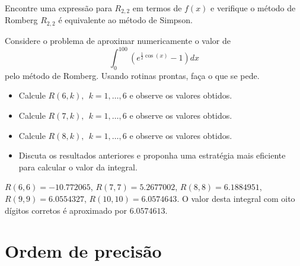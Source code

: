 \begin{Exercise}
Encontre uma expressão para $R_{2,2}$ em termos de $f(x)$ e verifique o método de Romberg $R_{2,2}$ é equivalente ao método de Simpson.
\end{Exercise}

\begin{Exercise}
Considere o problema de aproximar numericamente o valor de
$$\int_0^{100} \left(e^{\frac{1}{2}\cos(x)}-1\right)dx$$
pelo método de Romberg. Usando rotinas prontas, faça o que se pede.
\begin{itemize}
\item Calcule $R(6,k),~~ k=1,\ldots,6$ e observe os valores obtidos.
\item Calcule $R(7,k),~~ k=1,\ldots,6$ e observe os valores obtidos.
\item Calcule $R(8,k),~~ k=1,\ldots,6$ e observe os valores obtidos.
\item Discuta os resultados anteriores e proponha uma estratégia mais eficiente para calcular o valor da integral.
\end{itemize}
\end{Exercise}
\begin{Answer}
  \begin{tiny}
 $R(6,6)=- 10.772065$, $R(7,7)=5.2677002$, $R(8,8)=6.1884951$, $R(9,9)=6.0554327$, $R(10,10)=6.0574643$. O valor desta integral com oito dígitos corretos é aproximado por  $6.0574613$.      
  \end{tiny}
\end{Answer}

\section{Ordem de precisão}

